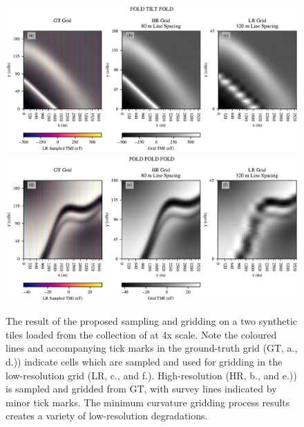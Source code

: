 \begin{figure}[hbtp!]
    \centering
    \includegraphics[width=\linewidth,trim={0 0 0 5mm},clip]{fig/p2/inp_data_Noddy_169.pdf}
    \includegraphics[width=\linewidth,trim={0 0 0 5mm},clip]{fig/p2/inp_data_Noddy_165.pdf}
    \caption[Low-resolution geophysics grids]{
        The result of the proposed sampling and gridding on a two synthetic tiles loaded from the collection of \textcite{jessellNoddyverseMassiveData2022} at 4x scale.
        Note the coloured lines and accompanying tick marks in the ground-truth grid (GT, a., d.)) indicate cells which are sampled and used for gridding in the low-resolution grid (LR, c., and f.).
        High-resolution (HR, b., and e.)) is sampled and gridded from GT, with survey lines indicated by minor tick marks.
        The minimum curvature gridding process results creates a variety of low-resolution degradations.
    }
    \label{fig:lrdata}
\end{figure}

